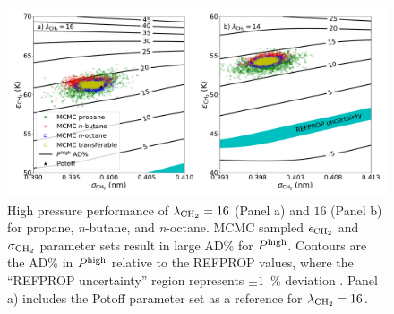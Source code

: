 \documentclass[preprint,letterpaper,floatfix,citeautoscript,aip,jcp]{revtex4-1}
\begin{document}

\begin{figure}[htb!]
	\centering
	\includegraphics[width=6.4in]{MCMC_Mie_14_16_propane_butane_octane}
	\caption{High pressure performance of $\lambda_{\rm CH_2} = 16$ (Panel a) and $16$ (Panel b) for propane, \textit{n}-butane, and \textit{n}-octane. MCMC sampled $\epsilon_{\rm CH_2}$ and $\sigma_{\rm CH_2}$ parameter sets result in large AD\% for $P^{\rm high}$. Contours are the AD\% in $P^{\rm high}$ relative to the REFPROP values, where the ``REFPROP uncertainty'' region represents $\pm 1$~\% deviation \cite{LEMMON-RP91,Propane2009,Butane2006,Beckmueller2017}. Panel a) includes the Potoff parameter set as a reference for $\lambda_{\rm CH_2} = 16$. \cite{Mie} }
	\label{fig:MCMC_Mie_14_16_propane_butane_octane}
\end{figure} 

\end{document}
